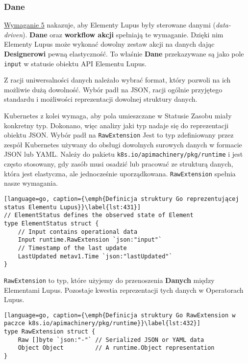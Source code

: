 \subsubsection{Dane}

\hyperref[req:5]{Wymaganie 5} nakazuje, aby Elementy Lupus były sterowane danymi (\textit{data-driven}). \textbf{Dane} oraz \textbf{workflow akcji} spełniają te wymaganie. Dzięki nim Elementy Lupus może wykonać dowolny zestaw akcji na danych dając \textbf{Designerowi} pewną elastyczność. To właśnie \textbf{Dane} przekazywane są jako pole \texttt{input} w statusie obiektu API Elementu Lupus. 

Z racji uniwersalności danych należało wybrać format, który pozwoli na ich możliwie dużą dowolność. Wybór padł na JSON, racji ogólnie przyjętego standardu i możliwości reprezentacji dowolnej struktury danych. 

Kubernetes z kolei wymaga, aby pola umieszczane w Statusie Zasobu miały konkretny typ. Dokonano, więc analizy jaki typ nadaje się do reprezentacji obiektu JSON. Wybór padł na \texttt{RawExtension} Jest to typ zdefiniowany przez zespół Kubernetes używany do obsługi dowolnych surowych danych w formacie JSON lub YAML. Należy do pakietu \texttt{k8s.io/apimachinery/pkg/runtime} i jest często stosowany, gdy zasób musi osadzić lub pracować ze strukturą danych, która jest elastyczna, ale jednocześnie uporządkowana. \texttt{RawExtension} spełnia nasze wymagania.

\begin{lstlisting}[language=go, caption={\emph{Definicja struktury Go reprezentującej status Elementu Lupus}}\label{lst:431}]
// ElementStatus defines the observed state of Element
type ElementStatus struct {
	// Input contains operational data
	Input runtime.RawExtension `json:"input"`
	// Timestamp of the last update
	LastUpdated metav1.Time `json:"lastUpdated"`
}
\end{lstlisting}

\texttt{RawExtension} to typ, które użyjemy do przenoszenia \textbf{Danych} między Elementami Lupus. Pozostaje kwestia reprezentacji tych danych w Operatorach Lupus. 

\begin{lstlisting}[language=go, caption={\emph{Definicja struktury Go RawExtension w paczce k8s.io/apimachinery/pkg/runtime}}\label{lst:432}]
type RawExtension struct {
    Raw []byte `json:"-"` // Serialized JSON or YAML data
    Object Object         // A runtime.Object representation
}
\end{lstlisting}

